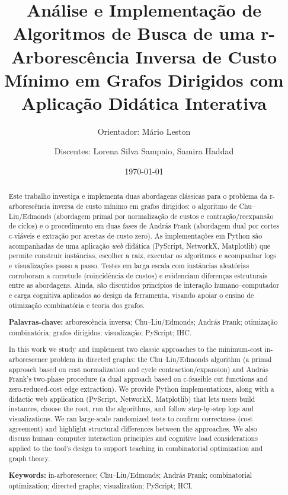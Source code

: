 \documentclass[12pt,a4paper]{article}
\title{Análise e Implementação de Algoritmos de Busca de uma r-Arborescência Inversa de Custo Mínimo em Grafos Dirigidos com Aplicação Didática Interativa}
\author{Orientador: Mário Leston 
\and Discentes: Lorena Silva Sampaio, Samira Haddad}
\date{\today}
\begin{document}
\maketitle

\begin{abstract}
    Este trabalho investiga e implementa duas abordagens clássicas para o problema da r-arborescência inversa de custo mínimo em grafos dirigidos: o algoritmo de Chu--Liu/Edmonds (abordagem primal por normalização de custos e contração/reexpansão de ciclos) e o procedimento em duas fases de András Frank (abordagem dual por cortes c-viáveis e extração por arestas de custo zero). As implementações em Python são acompanhadas de uma aplicação \textit{web} didática (PyScript, NetworkX, Matplotlib) que permite construir instâncias, escolher a raiz, executar os algoritmos e acompanhar logs e visualizações passo a passo. Testes em larga escala com instâncias aleatórias corroboram a corretude (coincidência de custos) e evidenciam diferenças estruturais entre as abordagens. Ainda, são discutidos princípios de interação humano--computador e carga cognitiva aplicados ao design da ferramenta, visando apoiar o ensino de otimização combinatória e teoria dos grafos.

    \medskip
    \noindent\textbf{Palavras-chave:} arborescência inversa; Chu--Liu/Edmonds; András Frank; otimização combinatória; grafos dirigidos; visualização; PyScript; IHC.
\end{abstract}

\begin{abstract}
    In this work we study and implement two classic approaches to the minimum-cost in-arborescence problem in directed graphs: the Chu--Liu/Edmonds algorithm (a primal approach based on cost normalization and cycle contraction/expansion) and András Frank's two-phase procedure (a dual approach based on c-feasible cut functions and zero-reduced-cost edge extraction). We provide Python implementations, along with a didactic web application (PyScript, NetworkX, Matplotlib) that lets users build instances, choose the root, run the algorithms, and follow step-by-step logs and visualizations. We ran large-scale randomized tests to confirm correctness (cost agreement) and highlight structural differences between the approaches. We also discuss human–computer interaction principles and cognitive load considerations applied to the tool's design to support teaching in combinatorial optimization and graph theory.

    \medskip
    \noindent\textbf{Keywords:} in-arborescence; Chu--Liu/Edmonds; András Frank; combinatorial optimization; directed graphs; visualization; PyScript; HCI.
\end{abstract}
\end{document}
